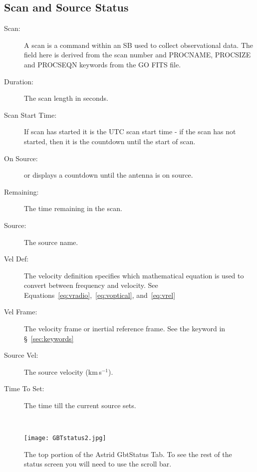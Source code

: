 \subsection{Scan and Source Status}
\begin{description}
\item[Scan:] A scan is a command within an \gls{SB} used to collect observational data.
The field here is derived from the scan number and \gls{PROCNAME}, \gls{PROCSIZE}
and \gls{PROCSEQN} keywords from the \gls{GO} FITS file. 
\item[Duration:] The scan length in seconds.
\item[Scan Start Time:] If scan has started it is the \gls{UTC} scan start time - if the
scan has not started, then it is the countdown until the start of scan. 
\item[On Source:]  or displays a countdown until the antenna is on source.
\item[Remaining:] The time remaining in the scan.
\item[Source:] The source name.
\item[Vel  Def:] The velocity definition specifies which mathematical equation is used to
convert between frequency and velocity.  See Equations~\ref{eq:vradio},~\ref{eq:voptical},
and~\ref{eq:vrel}
\item[Vel Frame:] The velocity frame or inertial reference frame.  See the 
keyword in \S~\ref{sec:keywords}
\item[Source Vel:] The source velocity (km\,s$^{-1}$).
\item[Time To Set:] The time till the current source sets. 
\end{description}
\ \newline

\begin{figure}[!h]
\begin{center}
\texttt{[image: GBTstatus2.jpg]}
\caption[Astrid Status Tab (bottom)]{The top portion of the \gls{Astrid} GbtStatus Tab.
To see the rest of the status screen you will need to use the scroll bar. 
\label{fig:astridstatustwo} }
\end{center}
\end{figure}
\newpage

